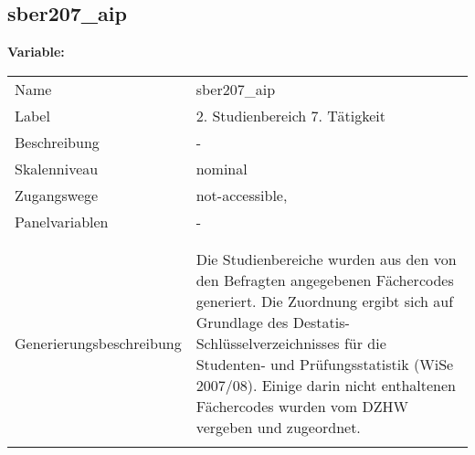 	
	
	\subsection{sber207\_aip}
	\label{subSection:sber207_aip}

	\noindent\textbf{Variable:}\\
		\begin{tabular}{lL{11.3cm}}
			\label{tableVariable:sber207_aip}
			Name & sber207\_aip \\
			Label & 2. Studienbereich 7. Tätigkeit \\
			Beschreibung & - \\
			Skalenniveau & nominal \\
			Zugangswege &
				not-accessible,
 \\
			Panelvariablen & -
			 \\
			 \\
 \\
					Generierungsbeschreibung & Die Studienbereiche wurden aus den von den Befragten angegebenen Fächercodes generiert. Die Zuordnung ergibt sich auf Grundlage des Destatis-Schlüsselverzeichnisses für die Studenten- und Prüfungsstatistik (WiSe 2007/08). Einige darin nicht enthaltenen Fächercodes wurden vom DZHW vergeben und zugeordnet. 
				 \\	
			 \\
		\end{tabular}






	
	\newpage
